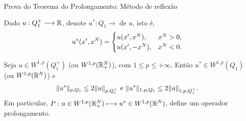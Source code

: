 \begin{frame}{Prova do Teorema do Prolongamento: Método de reflexão}


Dado $u:Q_1^+\longrightarrow \mathbb{R}$, denote $u^\ast:Q_1\longrightarrow$  de $u$, isto é,
\[u^\ast(x',x^N)=\begin{cases}
	u(x',x^N), & x^N>0,\\ u(x',-x^N), & x^N<0.
\end{cases}\]
	
	\begin{lema}
		Seja $u\in W^{1,p}(Q_1^+)$ (ou $ W^{1,p}(\mathbb{R}^N_+)$), com $1\leq p\leq +\infty$. Então $u^\ast\in W^{1,p}(Q_1)$ (ou $ W^{1,p}(\mathbb{R}^N)$) e 
		\[\lVert u^\ast\rVert_{p,Q_1}\leq 2\lVert u\rVert_{p,Q_1^+} \text{ e } \lVert u^\ast\rVert_{1,p,Q_1}\leq 2\lVert u\rVert_{1,p,Q_1^+}.\]
		Em particular, $P:u\in W^{1,p}(\mathbb{R}_+^N) \longmapsto u^\ast \in W^{1,p}(\mathbb{R}^N)$, define um operador prolongamento.
	\end{lema}
	
	
\end{frame}



